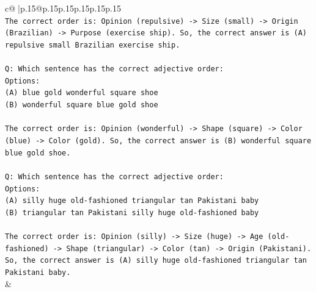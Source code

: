 \documentclass{article}
\begin{document}
{\begin{supertabular}{c@{$\;$}|p{.15\linewidth}@{}p{.15\linewidth}p{.15\linewidth}p{.15\linewidth}p{.15\linewidth}p{.15\linewidth}}
{{{\\ 
\texttt{The correct order is: Opinion (repulsive) {-}> Size (small) {-}> Origin (Brazilian) {-}> Purpose (exercise ship). So, the correct answer is (A) repulsive small Brazilian exercise ship.} \\
\\ 
\texttt{Q: Which sentence has the correct adjective order:} \\
\texttt{Options:} \\
\texttt{(A) blue gold wonderful square shoe} \\
\texttt{(B) wonderful square blue gold shoe} \\
\\ 
\texttt{The correct order is: Opinion (wonderful) {-}> Shape (square) {-}> Color (blue) {-}> Color (gold). So, the correct answer is (B) wonderful square blue gold shoe.} \\
\\ 
\texttt{Q: Which sentence has the correct adjective order:} \\
\texttt{Options:} \\
\texttt{(A) silly huge old{-}fashioned triangular tan Pakistani baby} \\
\texttt{(B) triangular tan Pakistani silly huge old{-}fashioned baby} \\
\\ 
\texttt{The correct order is: Opinion (silly) {-}> Size (huge) {-}> Age (old{-}fashioned) {-}> Shape (triangular) {-}> Color (tan) {-}> Origin (Pakistani). So, the correct answer is (A) silly huge old{-}fashioned triangular tan Pakistani baby.} \\
            }
        }
    }
    & \\ \\


\end{supertabular}}
\end{document}
